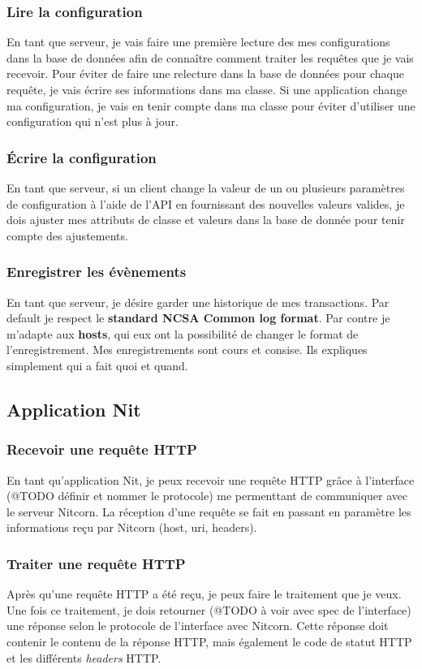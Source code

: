 \documentclass{scrreprt}
\begin{document}
\subsubsection{Lire la configuration}
En tant que serveur, je vais faire une première lecture des mes configurations
dans la base de données afin de connaître comment traiter les requêtes que je 
vais recevoir.
Pour éviter de faire une relecture dans la base de données pour chaque requête,
je vais écrire ses informations dans ma classe.
Si une application change ma configuration, je vais en tenir compte dans ma
classe pour éviter d'utiliser une configuration qui n'est plus à jour.

\subsubsection{Écrire la configuration}
En tant que serveur, si un client change la valeur de un ou plusieurs paramètres
de configuration à l'aide de l'API en fournissant des nouvelles valeurs valides,
je dois ajuster mes attributs de classe et valeurs dans la base de donnée 
pour tenir compte des ajustements.

\subsubsection{Enregistrer les évènements}
En tant que serveur, je désire garder une historique de mes transactions. Par
default je respect le \textbf{standard NCSA Common log format}. Par contre je m'adapte
aux \textbf{hosts}, qui eux ont la possibilité de changer le format de
l'enregistrement. Mes enregistrements sont cours et consise. Ils expliques
simplement qui a fait quoi et quand.

\subsection{Application Nit}
\subsubsection{Recevoir une requête HTTP}
En tant qu'application Nit, je peux recevoir une requête HTTP grâce à l'interface
(@TODO définir et nommer le protocole) me permenttant de communiquer avec le serveur
Nitcorn. La réception d'une requête se fait en passant en paramètre les informations
reçu par Nitcorn (host, uri, headers).

\subsubsection{Traiter une requête HTTP}
Après qu'une requête HTTP a été reçu, je peux faire le traitement que je veux.
Une fois ce traitement, je dois retourner (@TODO à voir avec spec de l'interface)
une réponse selon le protocole de l'interface avec Nitcorn. Cette réponse doit
contenir le contenu de la réponse HTTP, mais également le code de statut HTTP
et les différents \textit{headers} HTTP.
\end{document}
